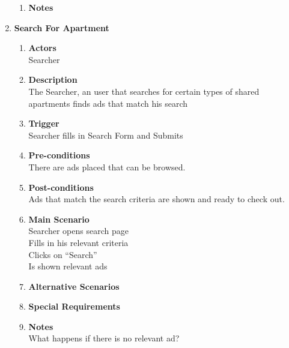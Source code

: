\documentclass{scrreprt}
\begin{document}
\begin{enumerate}
\begin{enumerate}
		\item \textbf{Notes} \\
	\end{enumerate}


	\item \textbf{Search For Apartment}
	\begin{enumerate}
		\item \textbf{Actors}  \\
			Searcher\\

		\item \textbf{Description} \\
			The Searcher, an user that searches for certain types of shared apartments finds ads that match his search\\
			
		\item \textbf{Trigger} \\
			Searcher fills in Search Form and Submits\\

		\item \textbf{Pre-conditions} \\
			There are ads placed that can be browsed.\\

		\item \textbf{Post-conditions} \\
			Ads that match the search criteria are shown and ready to check out.\\

		\item \textbf{Main Scenario} \\
			Searcher opens search page\\
			Fills in his relevant criteria\\
			Clicks on “Search”\\
			Is shown relevant ads\\

		\item \textbf{Alternative Scenarios} \\

		\item \textbf{Special Requirements} \\

		\item \textbf{Notes} \\
			What happens if there is no relevant ad?\\
	\end{enumerate}



\end{enumerate}
\end{document}

